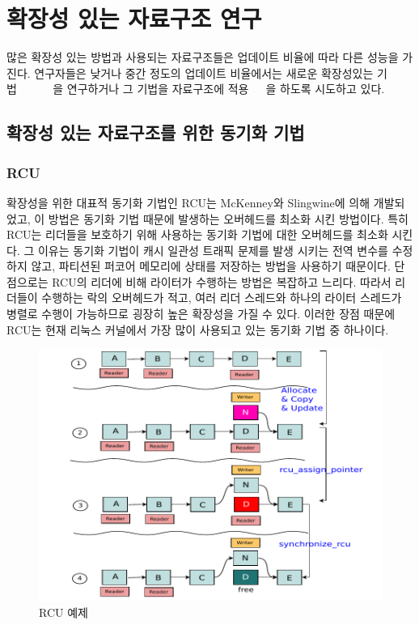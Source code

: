 \newpage
\section{확장성 있는 자료구조 연구}
\label{sec:datarelated}
많은 확장성 있는 방법과 사용되는 자료구조들은 업데이트 비율에 따라 다른 성능을 가진다.  
연구자들은 낮거나 중간 정도의 업데이트 비율에서는 새로운 확장성있는
기법~\cite{McKenney98}~\cite{Matveev2015RLU}~\cite{Harris2001Lockfree} ~\cite{Fomitchev2004Lockfree}
~\cite{Timnat2012}을 연구하거나 그 기법을 자료구조에 
적용~\cite{Arbel2014ConcurrentRCU}~\cite{Dodds2015SCT}~\cite{AustinTClements2012RCUBalancedTrees}을
하도록 시도하고 있다.

\subsection{확장성 있는 자료구조를 위한 동기화 기법}

\subsubsection{RCU}
확장성을 위한 대표적 동기화 기법인 RCU는 McKenney와 Slingwine에 의해 개발되었고, 
이 방법은 동기화 기법 때문에 발생하는 오버헤드를 최소화 시킨 방법이다.
특히 RCU는 리더들을 보호하기 위해 사용하는 동기화 기법에 대한 오버헤드를 최소화 시킨다.
그 이유는 동기화 기법이 캐시 일관성 트래픽 문제를 발생 시키는 전역 변수를 수정하지 않고, 
파티션된 퍼코어 메모리에 상태를 저장하는 방법을 사용하기 때문이다.
단점으로는 RCU의 리더에 비해 라이터가 수행하는 방법은 복잡하고 느리다. 
따라서 리더들이 수행하는 락의 오버헤드가 적고, 여러 리더 스레드와
하나의 라이터 스레드가 병렬로 수행이 가능하므로 굉장히 높은 확장성을 가질 수 있다.
이러한 장점 때문에 RCU는 현재 리눅스 커널에서 가장 많이 사용되고 있는 동기화 기법 중 하나이다. 

\begin{figure}[h]
    \centering
    \includegraphics[width=1\textwidth]{fig/rcu/rcu_principle}
    \caption{RCU 예제}
  \label{fig:rcuprinciple}
\end{figure}

